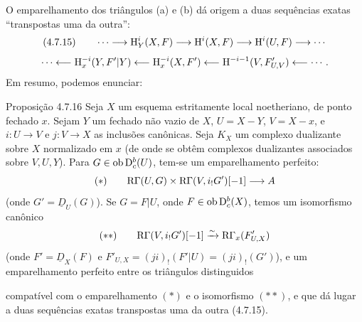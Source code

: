 O emparelhamento dos triângulos (a) e (b) dá origem a duas sequências exatas \textquotedblleft transpostas uma da outra\textquotedblright{}:
\[
(4.7.15)\qquad \cdots\longrightarrow \mathrm{H}_Y^i(X,F)\longrightarrow\mathrm{H}^i(X,F)\longrightarrow\mathrm{H}^i(U,F)\longrightarrow\cdots
\]
\[
\cdots\longleftarrow \mathrm{H}_x^{-i}(Y,F'|Y)\longleftarrow\mathrm{H}_x^{-i}(X,F')\longleftarrow\mathrm{H}^{-i-1}(V,F'_{U,V})\longleftarrow\cdots.
\]
Em resumo, podemos enunciar:

\begin{statement}{Proposição 4.7.16}
Seja $X$ um esquema estritamente local noetheriano, de ponto fechado $x$. Sejam $Y$ um fechado não vazio de $X$, $U=X-Y$, $V=X-x$, e $i:U\to V$ e $j:V\to X$ as inclusões canônicas. Seja $K_X$ um complexo dualizante sobre $X$ normalizado em $x$ (de onde se obtêm complexos dualizantes associados sobre $V,U,Y$). Para $G\in\operatorname{ob}\mathrm{D}_c^b(U)$, tem-se um emparelhamento perfeito:
\[
(*)\qquad \mathrm{R}\Gamma(U,G)\times\mathrm{R}\Gamma(V,i_!G')[-1]\longrightarrow A
\]
(onde $G'=\underline{D}_U(G)$). Se $G=F|U$, onde $F\in\operatorname{ob}\mathrm{D}_c^b(X)$, temos um isomorfismo canônico
\[
(**)\qquad \mathrm{R}\Gamma(V,i_!G')[-1]\xrightarrow{\sim}\mathrm{R}\Gamma_x(F'_{U,X})
\]
(onde $F'=\underline{D}_X(F)$ e $F'_{U,X}=(ji)_!(F'|U)=(ji)_!(G')$), e um emparelhamento perfeito entre os triângulos distinguidos
\begin{center}
\end{center}
compatível com o emparelhamento $(*)$ e o isomorfismo $(**)$, e que dá lugar a duas sequências exatas transpostas uma da outra (4.7.15).
\end{statement}

